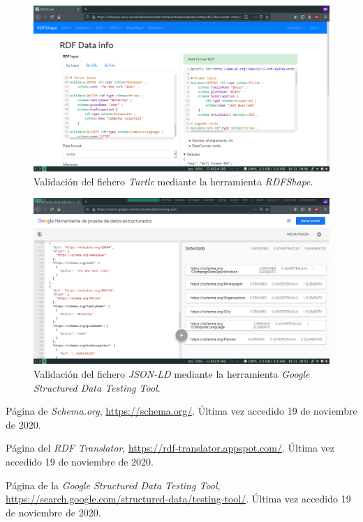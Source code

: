 \documentclass[11pt]{article}
\begin{document}
\begin{figure}[h]
\caption{Validación del fichero \textit{Turtle} mediante la herramienta \textit{RDFShape}.}
\centering
\includegraphics[width=\textwidth]{weso_turtle}
\end{figure}

\begin{figure}[h]
\caption{Validación del fichero \textit{JSON-LD} mediante la herramienta \textit{Google Structured Data Testing Tool}.}
\centering
\includegraphics[width=\textwidth]{google_jsonld}
\end{figure}
\begin{thebibliography}{8}
Página de \textit{Schema.org}, \url{https://schema.org/}. Última vez accedido 19 de noviembre de 2020.        

Página del \textit{RDF Translator}, \url{https://rdf-translator.appspot.com/}. Última vez accedido 19 de noviembre de 2020.

Página de la \textit{Google Structured Data Testing Tool}, \url{https://search.google.com/structured-data/testing-tool/}. Última vez accedido 19 de noviembre de 2020.
\end{thebibliography}
\end{document}
